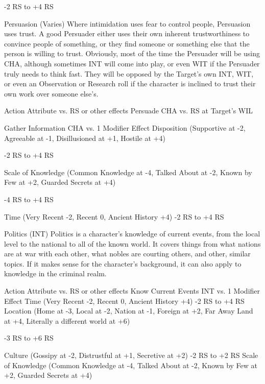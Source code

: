 \documentclass[oneside,11pt,english]{book}
\begin{document}
-2 RS to +4 RS 

 

 

Persuasion (Varies) 
Where intimidation uses fear to control people, Persuasion uses trust. A good Persuader either uses their 
own inherent trustworthiness to convince people of something, or they find someone or something else 
that the person is willing to trust. Obviously, most of the time the Persuader will be using CHA, although 
sometimes INT will come into play, or even WIT if the Persuader truly needs to think fast. They will be 
opposed by the Target’s own INT, WIT, or even an Observation or Research roll if the character is 
inclined to trust their own work over someone else’s. 

 

Action Attribute vs. RS or 
other effects 
Persuade CHA vs. RS at Target’s 
WIL 


Gather Information CHA vs. 1 
Modifier Effect 
Disposition (Supportive at -2, Agreeable at -1, Disillusioned at +1, Hostile at +4)

-2 RS to +4 RS 

Scale of Knowledge (Common Knowledge at -4, Talked About at -2, Known 
by Few at +2, Guarded Secrets at +4) 

-4 RS to +4 RS 

Time (Very Recent -2, Recent 0, Ancient History +4) -2 RS to +4 RS 

 

 

 

Politics (INT) 
Politics is a character’s knowledge of current events, from the local level to the national to all of the 
known world. It covers things from what nations are at war with each other, what nobles are courting 
others, and other, similar topics. If it makes sense for the character’s background, it can also apply to 
knowledge in the criminal realm. 

 

Action Attribute vs. RS or 
other effects 
Know Current Events INT vs. 1 
Modifier Effect 
Time (Very Recent -2, Recent 0, Ancient History +4) -2 RS to +4 RS 
Location (Home at -3, Local at -2, Nation at -1, Foreign at +2, Far Away Land 
at +4, Literally a different world at +6) 

-3 RS to +6 RS 

Culture (Gossipy at -2, Distrustful at +1, Secretive at +2) -2 RS to +2 RS 
Scale of Knowledge (Common Knowledge at -4, Talked About at -2, Known 
by Few at +2, Guarded Secrets at +4) 
\end{document}
